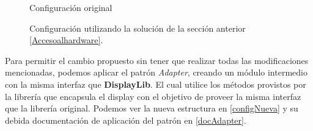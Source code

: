 \begin{figure}[!h]
\caption{Configuración original}
\begin{center}
\end{center}
\end{figure}

\begin{figure}[!h]
\caption{Configuración utilizando la solución de la sección anterior \ref{Accesoalhardware}.}
\begin{center}
\end{center}
\end{figure}


Para permitir el cambio propuesto sin tener que realizar todas las modificaciones mencionadas, podemos aplicar el patrón \textit{Adapter}, creando un módulo intermedio con la misma interfaz que \textbf{DisplayLib}. El cual utilice los métodos provistos por la librería que encapsula el display con el objetivo de proveer la misma interfaz que la librería original. Podemos ver la nueva estructura en \ref{configNueva} y su debida documentación de aplicación del patrón en \ref{docAdapter}.

